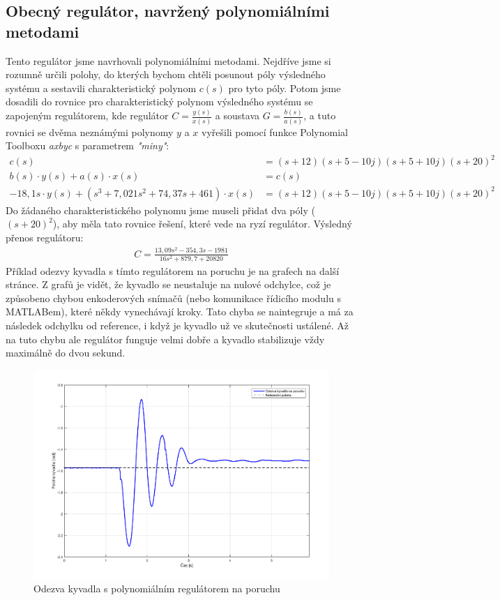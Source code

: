 \documentclass[a4paper,12pt]{article}
\begin{document}
\subsection{Obecný regulátor, navržený polynomiálními metodami}
Tento regulátor jsme navrhovali polynomiálními metodami. Nejdříve jsme si rozumně určili polohy, do kterých bychom chtěli posunout póly výsledného systému a sestavili charakteristický polynom $c(s)$ pro tyto póly. Potom jsme dosadili do rovnice pro charakteristický polynom výsledného systému se zapojeným regulátorem, kde regulátor $C = \frac{y(s)}{x(s)}$ a soustava $G = \frac{b(s)}{a(s)}$, a tuto rovnici se dvěma neznámými polynomy $y$ a $x$ vyřešili pomocí funkce Polynomial Toolboxu \textit{axbyc} s parametrem \textit{"miny"}:
\begin{align*}
c(s) &= (s + 12) (s + 5 - 10j) (s + 5 + 10j) (s + 20)^2	\\
b(s)\cdot y(s) + a(s)\cdot x(s) &= c(s)	\\
-18,1s\cdot y(s) + (s^3 + 7,021s^2 + 74,37s + 461)\cdot x(s) &=  (s + 12) (s + 5 - 10j) (s + 5 + 10j) (s + 20)^2
\end{align*}
Do žádaného charakteristického polynomu jsme museli přidat dva póly ($(s+20)^2$), aby měla tato rovnice řešení, které vede na ryzí regulátor.
\newline
Výsledný přenos regulátoru:
\begin{align*}
C = \frac{13,09s^2 - 354,3s - 1981}{16s^2 + 879,7 + 20820}
\end{align*}
Příklad odezvy kyvadla s tímto regulátorem na poruchu je na grafech na další stránce. Z grafů je vidět, že kyvadlo se neustaluje na nulové odchylce, což je způsobeno chybou enkoderových snímačů (nebo komunikace řídicího modulu s MATLABem), které někdy vynechávají kroky. Tato chyba se naintegruje a má za následek odchylku od reference, i když je kyvadlo už ve skutečnosti ustálené.
\newline
\newline
Až na tuto chybu ale regulátor funguje velmi dobře a kyvadlo stabilizuje vždy maximálně do dvou sekund.
\begin{figure}[H]
	\centering
    \includegraphics[scale=0.55]{odezva_kyvadlo_poly}
    \caption{Odezva kyvadla s polynomiálním regulátorem na poruchu}
\end{figure}
\end{document}
